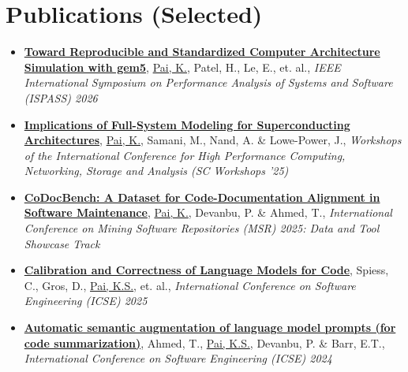 \documentclass[letterpaper,10pt]{article}
\newcommand{\resumeItem}[1]{\item\small{#1} \vspace{-3pt}}
\begin{document}
\section{Publications (Selected)}
{\normalsize
\begin{itemize}[leftmargin=0.15in, label={}, itemsep=0pt]
  \resumeItem{\href{https://doi.org/10.1109/ISPASS69572.2026.00027}{\textbf{Toward Reproducible and Standardized Computer Architecture Simulation with gem5}}, \underline{Pai, K.}, Patel, H., Le, E., et. al., \textit{IEEE International Symposium on Performance Analysis of Systems and Software (ISPASS) 2026}}
  \resumeItem{\href{https://doi.org/10.1145/3731599.3769278}{\textbf{Implications of Full-System Modeling for Superconducting Architectures}}, \underline{Pai, K.}, Samani, M., Nand, A. \& Lowe-Power, J., \textit{Workshops of the International Conference for High Performance Computing, Networking, Storage and Analysis (SC Workshops '25)}}
  \resumeItem{\href{https://doi.org/10.1109/MSR66628.2025.00077}{\textbf{CoDocBench: A Dataset for Code-Documentation Alignment in Software Maintenance}}, \underline{Pai, K.}, Devanbu, P. \& Ahmed, T., \textit{International Conference on Mining Software Repositories (MSR) 2025: Data and Tool Showcase Track}}
  \resumeItem{\href{https://doi.org/10.1109/ICSE55347.2025.00040}{\textbf{Calibration and Correctness of Language Models for Code}}, Spiess, C., Gros, D., \underline{Pai, K.S.}, et. al., \textit{International Conference on Software Engineering (ICSE) 2025}}
  \resumeItem{\href{https://dl.acm.org/doi/pdf/10.1145/3597503.3639183}{\textbf{Automatic semantic augmentation of language model prompts (for code summarization)}}, Ahmed, T., \underline{Pai, K.S.}, Devanbu, P. \& Barr, E.T., \textit{International Conference on Software Engineering (ICSE) 2024}}
\end{itemize}
}
\end{document}
